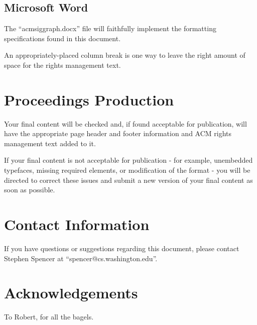\documentclass[tog]{acmsiggraph}
\begin{document}
\subsection{Microsoft Word}

The ``acmsiggraph.docx'' file will faithfully implement the formatting
specifications found in this document.

An appropriately-placed column break is one way to leave the right
amount of space for the rights management text.

\section{Proceedings Production}

Your final content will be checked and, if found acceptable for publication, will have the appropriate page header and footer information and ACM rights management text added to it. 

If your final content is not acceptable for publication - for example, unembedded typefaces, missing required elements, or modification of the format - you will be directed to correct these issues and submit a new version of your final content as soon as possible.

\section{Contact Information}

If you have questions or suggestions regarding this document, please
contact Stephen Spencer at ``spencer@cs.washington.edu''.

\section*{Acknowledgements}

To Robert, for all the bagels.


\nocite{*}

\end{document}
